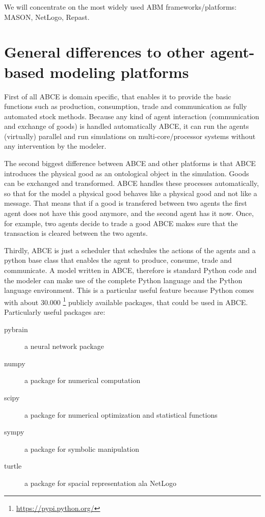 \documentclass[letterpaper,10pt,english]{sphinxmanual}
\begin{document}
We will concentrate on the most widely used ABM frameworks/platforms: MASON, NetLogo, Repast.


\section{General differences to other agent-based modeling platforms}
\label{introduction:general-differences-to-other-agent-based-modeling-platforms}
First of all ABCE is domain specific, that enables it to provide
the basic functions such as production, consumption, trade and
communication as fully automated stock methods.
Because any kind of agent interaction (communication and exchange of
goods) is handled automatically ABCE, it can run the agents (virtually)
parallel and run simulations on multi-core/processor systems without
any intervention by the modeler.

The second biggest difference between ABCE and other platforms
is that ABCE introduces the physical good as an ontological object in
the simulation. Goods can be exchanged and transformed. ABCE handles
these processes automatically, so that for the model a physical good
behaves like a physical good and not like a message. That means that
if a good is transfered between two agents the first agent does not
have this good anymore, and the second agent has it now. Once, for
example, two agents decide to trade
a good ABCE makes sure that the transaction is cleared between
the two agents.

Thirdly, ABCE is just a scheduler that schedules the actions of
the agents and a python base class that enables the agent to
produce, consume, trade and communicate. A model written
in ABCE, therefore is standard Python code and the modeler can make
use of the complete Python language and the Python language environment.
This is a particular useful feature because Python comes with about 30.000 \footnote{
\href{https://pypi.python.org/}{https://pypi.python.org/}
}
publicly available packages, that could be used in ABCE. Particularly
useful packages are:
\begin{description}
\item[{pybrain}] \leavevmode
a neural network package

\item[{numpy}] \leavevmode
a package for numerical computation

\item[{scipy}] \leavevmode
a package for numerical optimization and statistical functions

\item[{sympy}] \leavevmode
a package for symbolic manipulation

\item[{turtle}] \leavevmode
a package for spacial representation ala NetLogo

\end{description}
\end{document}
